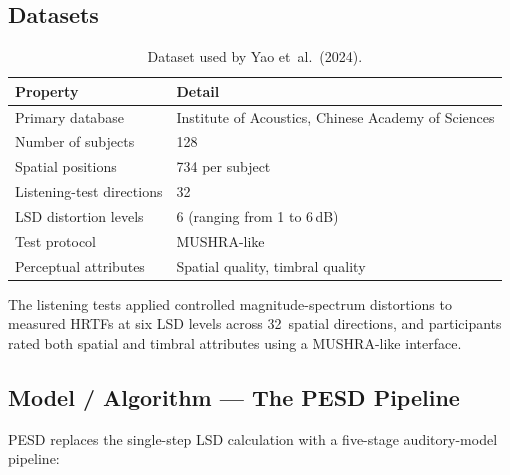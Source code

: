 \documentclass[12pt,a4paper]{article}
\begin{document}
\subsection{Datasets}

\begin{table}[h]
\centering
\caption{Dataset used by Yao et~al.\ (2024).}
\label{tab:pesd_data}
\begin{tabular}{@{}ll@{}}
\toprule
\textbf{Property}        & \textbf{Detail} \\ \midrule
Primary database          & Institute of Acoustics, Chinese Academy of Sciences \\
Number of subjects        & 128 \\
Spatial positions         & 734 per subject \\
Listening-test directions & 32 \\
LSD distortion levels     & 6 (ranging from 1 to 6\,dB) \\
Test protocol             & MUSHRA-like \\
Perceptual attributes     & Spatial quality, timbral quality \\
\bottomrule
\end{tabular}
\end{table}

The listening tests applied controlled magnitude-spectrum distortions to
measured HRTFs at six LSD levels across 32~spatial directions, and
participants rated both spatial and timbral attributes using a MUSHRA-like
interface.

\subsection{Model / Algorithm --- The PESD Pipeline}

PESD replaces the single-step LSD calculation with a five-stage
auditory-model pipeline:
\end{document}
